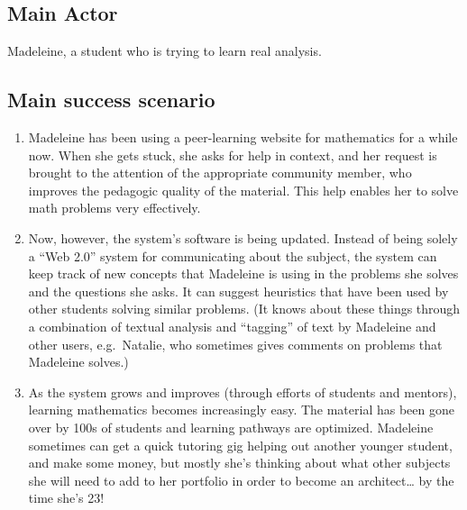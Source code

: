 \subsection{Main Actor}

Madeleine, a student who is trying to learn real analysis.

\subsection{Main success scenario}

\begin{enumerate}
\item
  Madeleine has been using a peer-learning website for mathematics for a
  while now. When she gets stuck, she asks for help in context, and her
  request is brought to the attention of the appropriate community
  member, who improves the pedagogic quality of the material. This help
  enables her to solve math problems very effectively.
\item
  Now, however, the system's software is being updated. Instead of being
  solely a ``Web 2.0'' system for communicating about the subject, the
  system can keep track of new concepts that Madeleine is using in the
  problems she solves and the questions she asks. It can suggest
  heuristics that have been used by other students solving similar
  problems. (It knows about these things through a combination of
  textual analysis and ``tagging'' of text by Madeleine and other users,
  e.g.~Natalie, who sometimes gives comments on problems that Madeleine
  solves.)
\item
  As the system grows and improves (through efforts of students and
  mentors), learning mathematics becomes increasingly easy. The material
  has been gone over by 100s of students and learning pathways are
  optimized. Madeleine sometimes can get a quick tutoring gig helping
  out another younger student, and make some money, but mostly she's
  thinking about what other subjects she will need to add to her
  portfolio in order to become an architect\ldots{} by the time she's
  23!
\end{enumerate}
